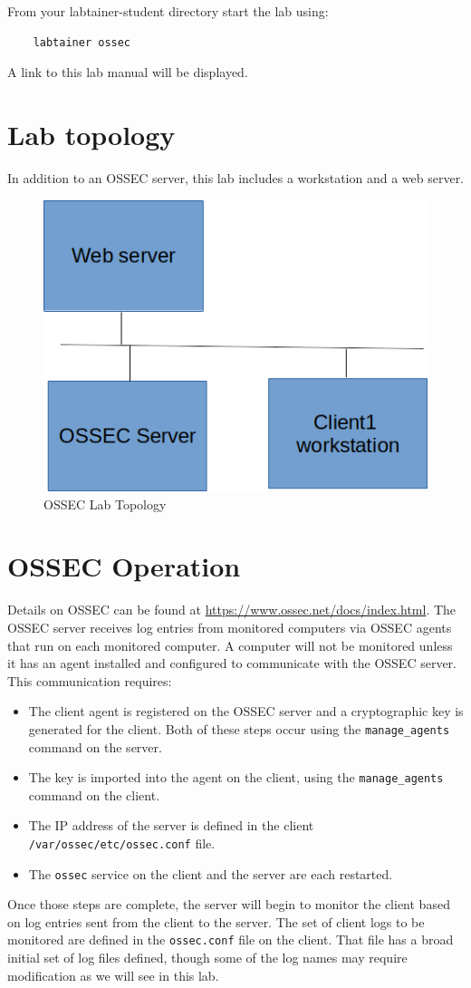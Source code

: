 From your labtainer-student directory start the lab using:
\begin{verbatim}
    labtainer ossec
\end{verbatim}
A link to this lab manual will be displayed.

\section{Lab topology}
In addition to an OSSEC server, this lab includes a workstation and a web server.

\begin{figure}[H]
\begin{center}
\includegraphics [width=0.8\linewidth]{ossec.png}
\end{center}
\caption{OSSEC Lab Topology}
\label{fig:topology}
\end{figure}

\section{OSSEC Operation}
Details on OSSEC can be found at \url{https://www.ossec.net/docs/index.html}.
The OSSEC server receives log entries from monitored computers via OSSEC agents that run on each monitored computer.  
A computer will not be monitored unless it has an agent installed and configured to communicate with the OSSEC server.
This communication requires:
\begin{itemize}
\item The client agent is registered on the OSSEC server and a cryptographic key is generated for the client.  Both
of these steps occur using the {\tt manage\_agents} command on the server.
\item The key is imported into the agent on the client, using the {\tt manage\_agents} command on the client.
\item The IP address of the server is defined in the client {\tt /var/ossec/etc/ossec.conf} file.
\item The {\tt ossec} service on the client and the server are each restarted.
\end{itemize}
Once those steps are complete, the server will begin to monitor the client based on log entries sent from the client
to the server.  The set of client logs to be monitored are defined in the {\tt ossec.conf} file on the client.
That file has a broad initial set of log files defined, though some of the log names may require modification as we
will see in this lab.

